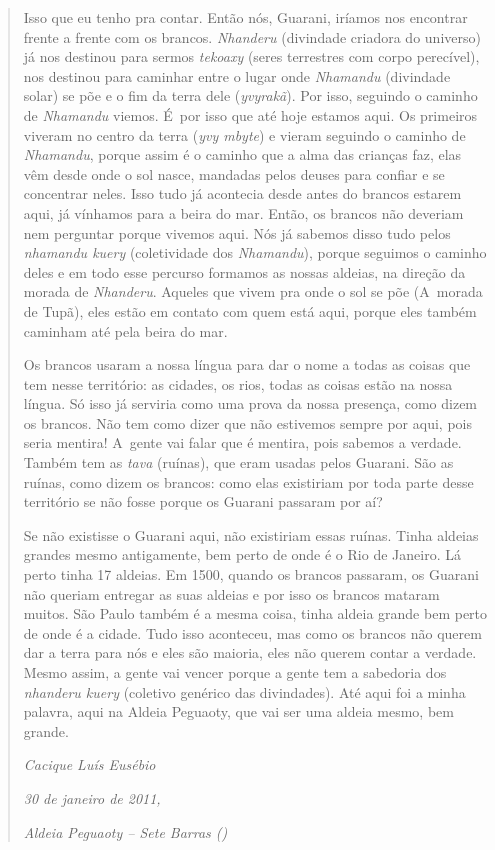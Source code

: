 \begin{quote}
\noindent
Isso que eu tenho pra contar. Então nós, Guarani, iríamos nos encontrar
frente a frente com os brancos. \emph{Nhanderu} (divindade criadora do
universo) já nos destinou para sermos \emph{tekoaxy} (seres terrestres com
corpo perecível), nos destinou para caminhar entre o lugar onde
\emph{Nhamandu} (divindade solar) se põe e o fim da terra dele
(\emph{yvyrakã}). Por isso, seguindo o caminho de \emph{Nhamandu} viemos. É~por isso
que até hoje estamos aqui. Os primeiros viveram no centro da terra (\emph{yvy
mbyte}) e vieram seguindo o caminho de \emph{Nhamandu}, porque assim é o caminho
que a alma das crianças faz, elas vêm desde onde o sol nasce, mandadas
pelos deuses para confiar e se concentrar neles. Isso tudo já acontecia
desde antes do brancos estarem aqui, já vínhamos para a beira do mar.
Então, os brancos não deveriam nem perguntar porque vivemos aqui. Nós
já sabemos disso tudo pelos \emph{nhamandu kuery} (coletividade dos \emph{Nhamandu}),
porque seguimos o caminho deles e em todo esse percurso formamos as
nossas aldeias, na direção da morada de \emph{Nhanderu}. Aqueles que vivem pra
onde o sol se põe (A~morada de Tupã), eles estão em contato com
quem está aqui, porque eles também caminham até pela beira do mar. 

\noindent
Os brancos usaram a nossa língua para dar o nome a todas as coisas que
tem nesse território: as cidades, os rios, todas as coisas estão na
nossa língua. Só isso já serviria como uma prova da nossa presença,
como dizem os brancos. Não tem como dizer que não estivemos sempre por
aqui, pois seria mentira! A~gente vai falar que é mentira, pois sabemos a
verdade. Também tem as \emph{tava} (ruínas), que eram usadas pelos Guarani.
São as ruínas, como dizem os brancos: como elas existiriam por toda
parte desse território se não fosse porque os Guarani passaram por aí? 

\noindent
Se não existisse o Guarani aqui, não existiriam essas ruínas. Tinha
aldeias grandes mesmo antigamente, bem perto de onde é o Rio de
Janeiro. Lá perto tinha 17 aldeias. Em 1500, quando os brancos
passaram, os Guarani não queriam entregar as suas aldeias e por isso os
brancos mataram muitos. São Paulo também é a mesma coisa, tinha aldeia
grande bem perto de onde é a cidade. Tudo isso aconteceu, mas como os
brancos não querem dar a terra para nós e eles são maioria, eles não
querem contar a verdade. Mesmo assim, a gente vai vencer porque a gente
tem a sabedoria dos \emph{nhanderu kuery} (coletivo genérico das divindades).
Até aqui foi a minha palavra, aqui na Aldeia Peguaoty, que vai ser uma
aldeia mesmo, bem grande.
\medskip
\begin{flushright}
\emph{Cacique Luís Eusébio}

\emph{30 de janeiro de 2011,}

\emph{Aldeia Peguaoty – Sete Barras ()}

\end{flushright}
\end{quote}

